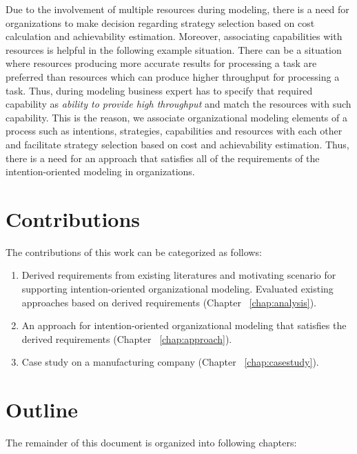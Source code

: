 Due to the involvement of multiple resources during modeling, there is a need for organizations to make decision regarding strategy selection based on cost calculation and achievability estimation. Moreover, associating capabilities with resources is helpful in the following example situation. There can be a situation where resources producing more accurate results for processing a task are preferred than resources which can produce higher throughput for processing a task. Thus, during modeling business expert has to specify that required capability as \textit{ability to provide high throughput} and match the resources with such capability. This is the reason, we associate organizational modeling elements of a process such as intentions, strategies, capabilities and resources with each other and facilitate strategy selection based on cost and achievability estimation. Thus, there is a need for an approach that satisfies all of the requirements of the intention-oriented modeling in organizations. 

\section {Contributions}
\label{sec:researchobjectives}
The contributions of this work can be categorized as follows:

\begin{enumerate}
 	\item Derived requirements from existing literatures and motivating scenario for supporting intention-oriented organizational modeling. Evaluated existing approaches based on derived requirements (Chapter  ~\ref{chap:analysis}).
 	\item An approach for intention-oriented organizational modeling that satisfies the derived requirements (Chapter ~\ref{chap:approach}).
 	\item Case study on a manufacturing company (Chapter ~\ref{chap:casestudy}).
\end{enumerate}
 
\section{Outline}
\label{sec:outline}
The remainder of this document is organized into following chapters:

